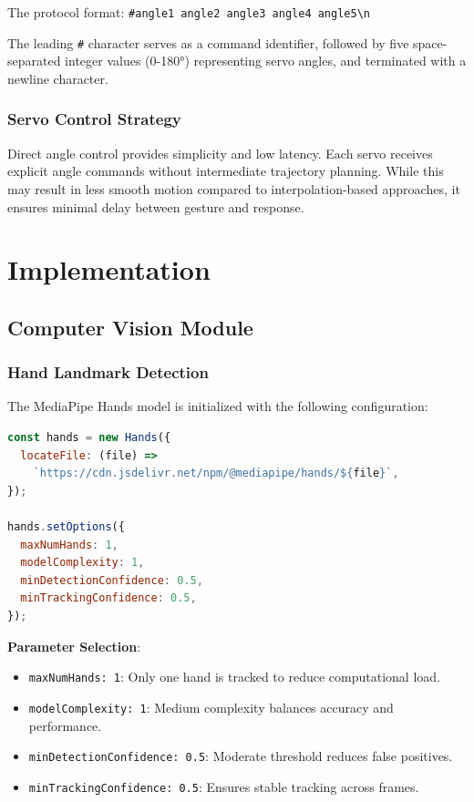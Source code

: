 \documentclass[12pt]{article}
\begin{document}
The protocol format: \texttt{\#angle1 angle2 angle3 angle4 angle5\textbackslash n}

The leading \texttt{\#} character serves as a command identifier, followed by five space-separated integer values (0-180°) representing servo angles, and terminated with a newline character.

\subsubsection{Servo Control Strategy}

Direct angle control provides simplicity and low latency. Each servo receives explicit angle commands without intermediate trajectory planning. While this may result in less smooth motion compared to interpolation-based approaches, it ensures minimal delay between gesture and response.

\newpage
\section{Implementation}

\subsection{Computer Vision Module}

\subsubsection{Hand Landmark Detection}

The MediaPipe Hands model is initialized with the following configuration:

\begin{lstlisting}[language=JavaScript, caption=MediaPipe Hands Initialization]
const hands = new Hands({
  locateFile: (file) => 
    `https://cdn.jsdelivr.net/npm/@mediapipe/hands/${file}`,
});

hands.setOptions({
  maxNumHands: 1,
  modelComplexity: 1,
  minDetectionConfidence: 0.5,
  minTrackingConfidence: 0.5,
});
\end{lstlisting}

\textbf{Parameter Selection}:
\begin{itemize}
    \item \texttt{maxNumHands: 1}: Only one hand is tracked to reduce computational load.
    \item \texttt{modelComplexity: 1}: Medium complexity balances accuracy and performance.
    \item \texttt{minDetectionConfidence: 0.5}: Moderate threshold reduces false positives.
    \item \texttt{minTrackingConfidence: 0.5}: Ensures stable tracking across frames.
\end{itemize}
\end{document}
